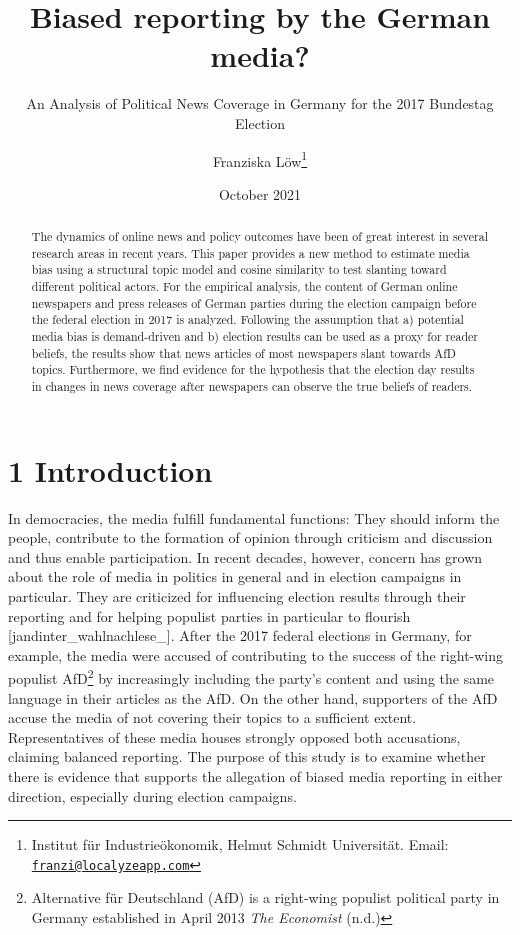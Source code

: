 \documentclass[
  12pt,
]{article}
\title{Biased reporting by the German media?}
\subtitle{An Analysis of Political News Coverage in Germany for the 2017
Bundestag Election}
\author{Franziska Löw\footnote{Institut für Industrieökonomik, Helmut
  Schmidt Universität. Email:
  \href{mailto:franzi@localyzeapp.com}{\nolinkurl{franzi@localyzeapp.com}}}}
\date{October 2021}
\begin{document}
\maketitle
\begin{abstract}
The dynamics of online news and policy outcomes have been of great
interest in several research areas in recent years. This paper provides
a new method to estimate media bias using a structural topic model and
cosine similarity to test slanting toward different political actors.
For the empirical analysis, the content of German online newspapers and
press releases of German parties during the election campaign before the
federal election in 2017 is analyzed. Following the assumption that a)
potential media bias is demand-driven and b) election results can be
used as a proxy for reader beliefs, the results show that news articles
of most newspapers slant towards AfD topics. Furthermore, we find
evidence for the hypothesis that the election day results in changes in
news coverage after newspapers can observe the true beliefs of readers.
\end{abstract}

\pagebreak
\tableofcontents
\pagebreak

\listoftables
\pagebreak

\listoffigures
\pagebreak

\hypertarget{introduction}{%
\section{1 Introduction}\label{introduction}}

In democracies, the media fulfill fundamental functions: They should
inform the people, contribute to the formation of opinion through
criticism and discussion and thus enable participation. In recent
decades, however, concern has grown about the role of media in politics
in general and in election campaigns in particular. They are criticized
for influencing election results through their reporting and for helping
populist parties in particular to flourish
{[}jandinter\_wahlnachlese\_{]}. After the 2017 federal elections in
Germany, for example, the media were accused of contributing to the
success of the right-wing populist AfD\footnote{Alternative für
  Deutschland (AfD) is a right-wing populist political party in Germany
  established in April 2013 \emph{The Economist} (n.d.)} by increasingly
including the party's content and using the same language in their
articles as the AfD. On the other hand, supporters of the AfD accuse the
media of not covering their topics to a sufficient extent.
Representatives of these media houses strongly opposed both accusations,
claiming balanced reporting. The purpose of this study is to examine
whether there is evidence that supports the allegation of biased media
reporting in either direction, especially during election campaigns.
\end{document}
